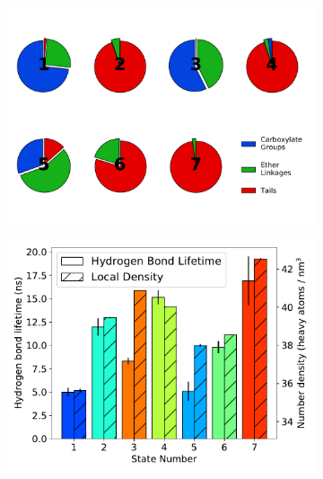 \documentclass{article}
\begin{document}
  \begin{figure}
  \centering
  \begin{subfigure}{0.54\textwidth}
  \includegraphics[width=\textwidth]{hbond_pi_charts.pdf}
  \caption{}\label{fig:hbond_pi_charts}
  \end{subfigure}
  \begin{subfigure}{0.45\textwidth}
  \includegraphics[width=\textwidth]{hbond_lifetimes_density_MET.pdf}
  \caption{}\label{fig:hbond_lifetimes_density_MET}
  \end{subfigure}

\end{figure}
\end{document}
